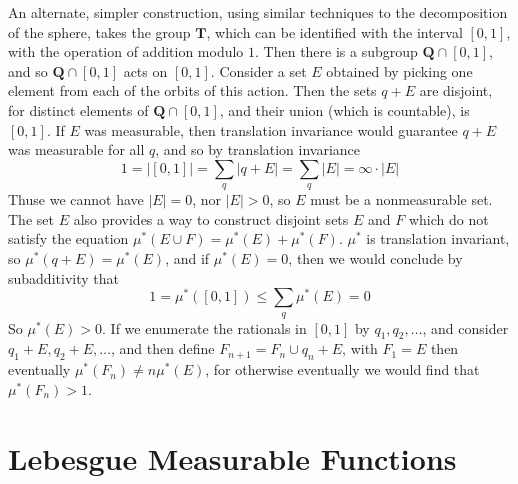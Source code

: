 An alternate, simpler construction, using similar techniques to the decomposition of the sphere, takes the group $\mathbf{T}$, which can be identified with the interval $[0,1]$, with the operation of addition modulo $1$. Then there is a subgroup $\mathbf{Q} \cap [0,1]$, and so $\mathbf{Q} \cap [0,1]$ acts on $[0,1]$. Consider a set $E$ obtained by picking one element from each of the orbits of this action. Then the sets $q + E$ are disjoint, for distinct elements of $\mathbf{Q} \cap [0,1]$, and their union (which is countable), is $[0,1]$. If $E$ was measurable, then translation invariance would guarantee $q + E$ was measurable for all $q$, and so by translation invariance
%
\[ 1 = |[0,1]| = \sum_q |q + E| = \sum_q |E| = \infty \cdot |E| \]
%
Thuse we cannot have $|E| = 0$, nor $|E| > 0$, so $E$ must be a nonmeasurable set. The set $E$ also provides a way to construct disjoint sets $E$ and $F$ which do not satisfy the equation $\mu^*(E \cup F) = \mu^*(E) + \mu^*(F)$. $\mu^*$ is translation invariant, so $\mu^*(q + E) = \mu^*(E)$, and if $\mu^*(E) = 0$, then we would conclude by subadditivity that
%
\[ 1 = \mu^*([0,1]) \leq \sum_q \mu^*(E) = 0 \]
%
So $\mu^*(E) > 0$. If we enumerate the rationals in $[0,1]$ by $q_1, q_2, \dots$, and consider $q_1 + E, q_2 + E, \dots$, and then define $F_{n+1} = F_n \cup q_n + E$, with $F_1 = E$ then eventually $\mu^*(F_n) \neq n \mu^*(E)$, for otherwise eventually we would find that $\mu^*(F_n) > 1$.

\chapter{Lebesgue Measurable Functions}

